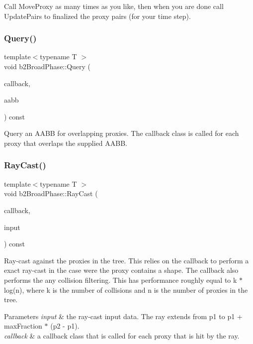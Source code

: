 Call Move\+Proxy as many times as you like, then when you are done call Update\+Pairs to finalized the proxy pairs (for your time step). \mbox{\label{classb2_broad_phase_a187586ea98b9d16e5ef6e12fa31f8de2}} 
\subsubsection{\texorpdfstring{Query()}{Query()}}
{\footnotesize\ttfamily template$<$typename T $>$ \\
void b2\+Broad\+Phase\+::\+Query (\begin{DoxyParamCaption}\item[{T $\ast$}]{callback,  }\item[{const \mbox{\hyperlink{structb2_a_a_b_b}{b2\+A\+A\+BB}} \&}]{aabb }\end{DoxyParamCaption}) const\hspace{0.3cm}{\ttfamily [inline]}}

Query an A\+A\+BB for overlapping proxies. The callback class is called for each proxy that overlaps the supplied A\+A\+BB. \mbox{\label{classb2_broad_phase_ae65392ea91c7d0839ed5312f78b2837a}} 
\subsubsection{\texorpdfstring{RayCast()}{RayCast()}}
{\footnotesize\ttfamily template$<$typename T $>$ \\
void b2\+Broad\+Phase\+::\+Ray\+Cast (\begin{DoxyParamCaption}\item[{T $\ast$}]{callback,  }\item[{const \mbox{\hyperlink{structb2_ray_cast_input}{b2\+Ray\+Cast\+Input}} \&}]{input }\end{DoxyParamCaption}) const\hspace{0.3cm}{\ttfamily [inline]}}

Ray-\/cast against the proxies in the tree. This relies on the callback to perform a exact ray-\/cast in the case were the proxy contains a shape. The callback also performs the any collision filtering. This has performance roughly equal to k $\ast$ log(n), where k is the number of collisions and n is the number of proxies in the tree. 
\begin{DoxyParams}{Parameters}
{\em input} & the ray-\/cast input data. The ray extends from p1 to p1 + max\+Fraction $\ast$ (p2 -\/ p1). \\
\hline
{\em callback} & a callback class that is called for each proxy that is hit by the ray. \\
\hline
\end{DoxyParams}
\mbox{\label{classb2_broad_phase_a410e6115e3d1b4fca61cfbf397767772}} 
